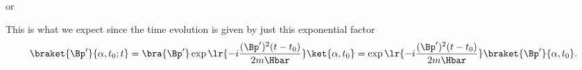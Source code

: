 {or
%

This is what we expect since the time evolution is given by just this exponential factor
%
\begin{dmath}\label{eqn:freeParticlePropagator:220}
\braket{\Bp'}{\alpha, t_0 ; t}
= \bra{\Bp'} \exp\lr{ -i \frac{(\Bp')^2 (t -t_0)}{2 m \Hbar}} \ket{\alpha, t_0}
=
\exp\lr{ -i \frac{(\Bp')^2 (t -t_0)}{2 m \Hbar}}
\braket{\Bp'}
{\alpha, t_0}.
\end{dmath}
%
} %

